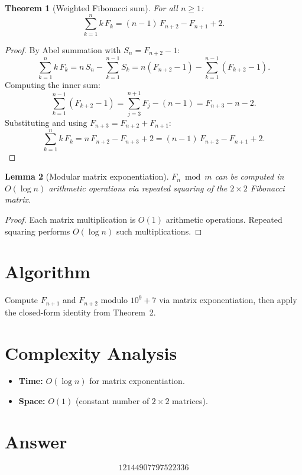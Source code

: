 \documentclass[11pt]{article}
\newtheorem{theorem}{Theorem}
\newtheorem{lemma}[theorem]{Lemma}
\theoremstyle{definition}
\begin{document}
\begin{theorem}[Weighted Fibonacci sum]
For all $n \geq 1$:
\[
\sum_{k=1}^{n} k \, F_k = (n-1) \, F_{n+2} - F_{n+1} + 2.
\]
\end{theorem}

\begin{proof}
By Abel summation with $S_n = F_{n+2} - 1$:
\[
\sum_{k=1}^{n} k \, F_k = n \, S_n - \sum_{k=1}^{n-1} S_k = n(F_{n+2} - 1) - \sum_{k=1}^{n-1}(F_{k+2} - 1).
\]
Computing the inner sum:
\[
\sum_{k=1}^{n-1}(F_{k+2} - 1) = \sum_{j=3}^{n+1} F_j - (n-1) = F_{n+3} - n - 2.
\]
Substituting and using $F_{n+3} = F_{n+2} + F_{n+1}$:
\[
\sum_{k=1}^{n} k \, F_k = n \, F_{n+2} - F_{n+3} + 2 = (n-1) \, F_{n+2} - F_{n+1} + 2.
\]
\end{proof}

\begin{lemma}[Modular matrix exponentiation]
$F_n \bmod m$ can be computed in $O(\log n)$ arithmetic operations via repeated squaring of the $2 \times 2$ Fibonacci matrix.
\end{lemma}

\begin{proof}
Each matrix multiplication is $O(1)$ arithmetic operations. Repeated squaring performs $O(\log n)$ such multiplications.
\end{proof}

\section{Algorithm}

Compute $F_{n+1}$ and $F_{n+2}$ modulo $10^9+7$ via matrix exponentiation, then apply the closed-form identity from Theorem~2.

\section{Complexity Analysis}

\begin{itemize}
\item \textbf{Time:} $O(\log n)$ for matrix exponentiation.
\item \textbf{Space:} $O(1)$ (constant number of $2 \times 2$ matrices).
\end{itemize}

\section{Answer}

\[
\boxed{12144907797522336}
\]
\end{document}
